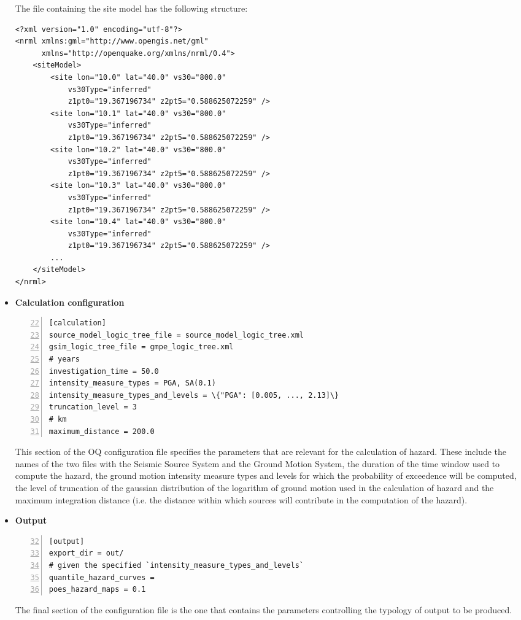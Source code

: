 \begin{itemize}
\begin{Verbatim}[frame=single, commandchars=\\\{\}, fontsize=\small,
    firstnumber=17, numbers=left, numbersep=2pt]
\end{Verbatim}
The file containing the site model has the following 
structure:
\begin{Verbatim}[frame=single, commandchars=\\\{\}, fontsize=\small]
<?xml version="1.0" encoding="utf-8"?>
<nrml xmlns:gml="http://www.opengis.net/gml"
      xmlns="http://openquake.org/xmlns/nrml/0.4">
    <siteModel>
        <site lon="10.0" lat="40.0" vs30="800.0" 
            vs30Type="inferred" 
            z1pt0="19.367196734" z2pt5="0.588625072259" />
        <site lon="10.1" lat="40.0" vs30="800.0" 
            vs30Type="inferred" 
            z1pt0="19.367196734" z2pt5="0.588625072259" />
        <site lon="10.2" lat="40.0" vs30="800.0" 
            vs30Type="inferred" 
            z1pt0="19.367196734" z2pt5="0.588625072259" />
        <site lon="10.3" lat="40.0" vs30="800.0" 
            vs30Type="inferred" 
            z1pt0="19.367196734" z2pt5="0.588625072259" />
        <site lon="10.4" lat="40.0" vs30="800.0" 
            vs30Type="inferred" 
            z1pt0="19.367196734" z2pt5="0.588625072259" />
        ...
    </siteModel>
</nrml>
\end{Verbatim}

%
\item \textbf{Calculation configuration}
\label{sec:calculation_configuration}
\begin{Verbatim}[frame=single, commandchars=\\\{\}, fontsize=\small,
     firstnumber=22, numbers=left, numbersep=2pt]
[calculation]
source_model_logic_tree_file = source_model_logic_tree.xml
gsim_logic_tree_file = gmpe_logic_tree.xml
# years
investigation_time = 50.0
intensity_measure_types = PGA, SA(0.1)
intensity_measure_types_and_levels = \{"PGA": [0.005, ..., 2.13]\} 
truncation_level = 3
# km
maximum_distance = 200.0
\end{Verbatim}
This section of the OQ configuration file specifies the parameters that
are relevant for the calculation of hazard. These include the names of
the two files with the Seismic Source System and the Ground Motion System,
the duration of the time window used to compute the hazard, the ground 
motion intensity measure types and levels for which the probability of 
exceedence will be computed, the level of truncation of the gaussian 
distribution of the logarithm of ground motion used in the calculation 
of hazard and the maximum integration distance (i.e. the distance within 
which sources will contribute in the computation of the hazard).
%
\item \textbf{Output}
\begin{Verbatim}[frame=single, commandchars=\\\{\}, fontsize=\small,
    firstnumber=32, numbers=left, numbersep=2pt]
[output]
export_dir = out/
# given the specified `intensity_measure_types_and_levels`
quantile_hazard_curves =
poes_hazard_maps = 0.1
\end{Verbatim}
The final section of the configuration file is the one that contains 
the parameters controlling the typology of output to be produced.
%
\end{itemize}
%
%
%
